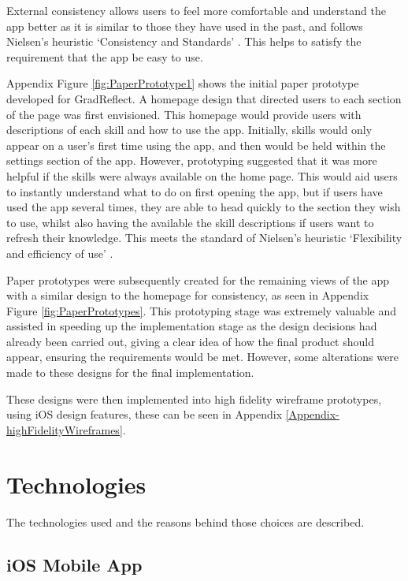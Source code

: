 \documentclass{l4proj}
\begin{document}
External consistency allows users to feel more comfortable and understand the app better as it is similar to those they have used in the past, and follows Nielsen’s heuristic ‘Consistency and Standards’ \citep{schlatter_visual_2013, Nielsen10}. This helps to satisfy the requirement that the app be easy to use. 

Appendix Figure \ref{fig:PaperPrototype1} shows the initial paper prototype developed for GradReflect. A homepage design that directed users to each section of the page was first envisioned. This homepage would provide users with descriptions of each skill and how to use the app. Initially, skills would only appear on a user’s first time using the app, and then would be held within the settings section of the app. However, prototyping suggested that it was more helpful if the skills were always available on the home page. This would aid users to instantly understand what to do on first opening the app, but if users have used the app several times, they are able to head quickly to the section they wish to use, whilst also having the available the skill descriptions if users want to refresh their knowledge. This meets the standard of Nielsen’s heuristic ‘Flexibility and efficiency of use’ \citep{Nielsen10}.

Paper prototypes were subsequently created for the remaining views of the app with a similar design to the homepage for consistency, as seen in Appendix Figure \ref{fig:PaperPrototypes}. This prototyping stage was extremely valuable and assisted in speeding up the implementation stage as the design decisions had already been carried out, giving a clear idea of how the final product should appear, ensuring the requirements would be met. However, some alterations were made to these designs for the final implementation. 

These designs were then implemented into high fidelity wireframe prototypes, using iOS design features, these can be seen in Appendix \ref{Appendix-highFidelityWireframes}.


\section{Technologies}

The technologies used and the reasons behind those choices are described.

\subsection{iOS Mobile App}
\end{document}
